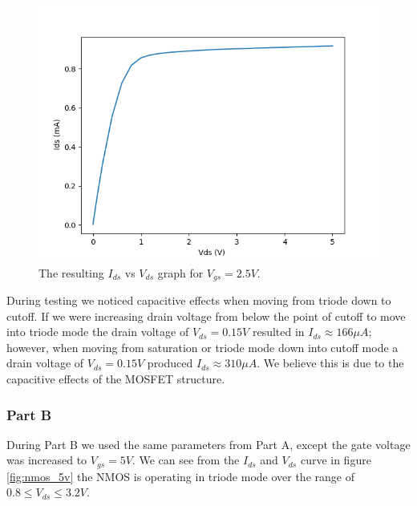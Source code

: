 		\begin{figure}[h!]
		\centering
		\includegraphics[scale=0.75]{./data/nmos.png}
		\caption{The resulting $I_{ds}$ vs $V_{ds}$ graph for $V_{gs}=2.5V$.}
		\label{fig:nmos}
		\end{figure}

		\FloatBarrier
		During testing we noticed capacitive effects when moving from triode down to cutoff. 
		If we were increasing drain voltage from below the point of cutoff to move into triode mode the drain voltage of $V_{ds}=0.15V$ resulted in $I_{ds}\approx 166 \mu A$;
		however, when moving from saturation or triode mode down into cutoff mode a drain voltage of $V_{ds}=0.15 V$ produced $I_{ds}\approx 310 \mu A$.
		We believe this is due to the capacitive effects of the MOSFET structure.

		\subsubsection{Part B}
		During Part B we used the same parameters from Part A, except the gate voltage was increased to $V_{gs} = 5V$. 
		We can see from the $I_{ds}$ and $V_{ds}$ curve in figure \ref{fig:nmos_5v} the NMOS is operating in triode mode over the range of $0.8 \le V_{ds} \le 3.2V$.

		\FloatBarrier

